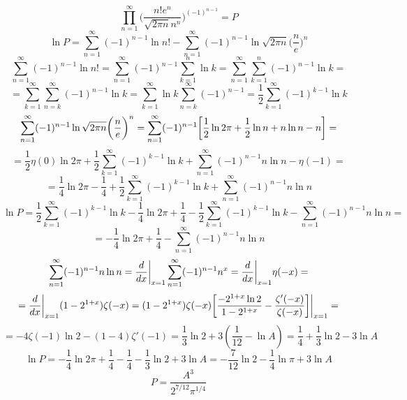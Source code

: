 


	$$\prod_{n = 1}^{\infty} \bigg(\frac{n! e^n}{\sqrt{2\pi n} n^n}\bigg)^{(-1)^{n-1}} = P$$
	$$\ln P = \sum_{n = 1}^{\infty} (-1)^{n-1} \ln n! - \sum_{n = 1}^{\infty} (-1)^{n-1} \ln \sqrt{2\pi n} \bigg(\frac{n}{e}\bigg)^n$$
	$$\sum_{n = 1}^{\infty} (-1)^{n-1} \ln n! = \sum_{n = 1}^{\infty} (-1)^{n-1} \sum_{k = 1}^{n} \ln k = \sum_{n = 1}^{\infty} \sum_{k = 1}^{n}  (-1)^{n-1} \ln k =$$
	$$= \sum_{k = 1}^{\infty} \sum_{n = k}^{\infty}  (-1)^{n-1} \ln k = \sum_{k = 1}^{\infty} \ln k \sum_{n = k}^{\infty} (-1)^{n-1} = \frac{1}{2} \sum_{k = 1}^{\infty} (-1)^{k-1} \ln k$$
	$$\sum_{n = 1}^{\infty} (-1)^{n-1} \ln \sqrt{2\pi n} \bigg(\frac{n}{e}\bigg)^n = \sum_{n = 1}^{\infty} (-1)^{n-1} \bigg{[} \frac{1}{2} \ln 2\pi +\frac{1}{2} \ln n +n\ln n - n \bigg{]}=$$
	$$= \frac{1}{2} \eta(0) \ln 2\pi  + \frac{1}{2} \sum_{k = 1}^{\infty} (-1)^{k-1} \ln k + \sum_{n = 1}^{\infty} (-1)^{n-1} n \ln n - \eta(-1)=$$
	$$= \frac{1}{4} \ln 2\pi - \frac{1}{4} +  \frac{1}{2} \sum_{k = 1}^{\infty} (-1)^{k-1} \ln k + \sum_{n = 1}^{\infty} (-1)^{n-1} n \ln n$$
	$$\ln P = \frac{1}{2} \sum_{k = 1}^{\infty} (-1)^{k-1} \ln k - \frac{1}{4} \ln 2\pi + \frac{1}{4} -  \frac{1}{2} \sum_{k = 1}^{\infty} (-1)^{k-1} \ln k - \sum_{n = 1}^{\infty} (-1)^{n-1} n \ln n =$$
	$$= - \frac{1}{4} \ln 2\pi + \frac{1}{4} - \sum_{n = 1}^{\infty} (-1)^{n-1} n \ln n$$
	$$\sum_{n = 1}^{\infty} (-1)^{n-1} n \ln n = \frac{d}{dx} \bigg{|}_{x = 1} \sum_{n = 1}^{\infty} (-1)^{n-1} n^x = \frac{d}{dx} \bigg{|}_{x = 1} \eta(-x) =$$
	$$= \frac{d}{dx} \bigg{|}_{x = 1} (1-2^{1+x})\zeta(-x) = (1-2^{1+x})\zeta(-x) \bigg{[} \frac{-2^{1+x}\ln 2}{1-2^{1+x}} - \frac{\zeta'(-x)}{\zeta(-x)} \bigg{]} \bigg{|}_{x = 1} =$$
	$$=-4\zeta(-1) \ln 2 - (1 - 4)\zeta'(-1) = \frac{1}{3}\ln 2 + 3 (\frac{1}{12} - \ln A) = \frac{1}{4} + \frac{1}{3} \ln 2 -  3\ln A$$
	$$\ln P = - \frac{1}{4} \ln 2\pi + \frac{1}{4} - \frac{1}{4} - \frac{1}{3} \ln 2 +  3\ln A = -\frac{7}{12} \ln 2 - \frac{1}{4} \ln \pi + 3\ln A$$
	$$P = \frac{A^3}{2^{7/12} \pi^{1/4}}$$
